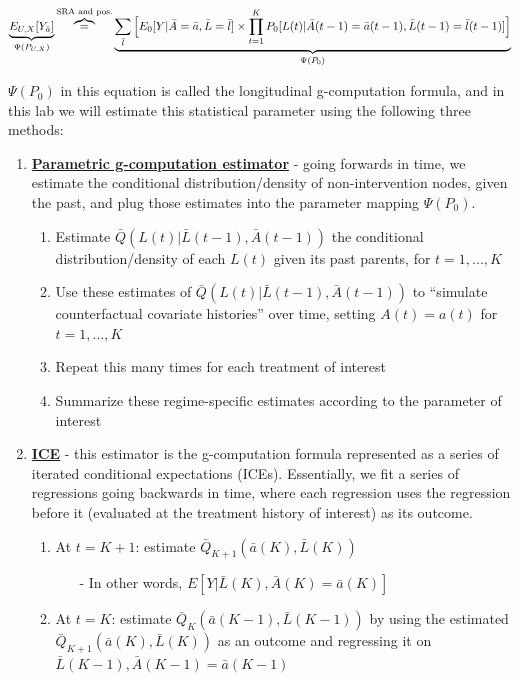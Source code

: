 \documentclass[answers]{exam}
\begin{document}
\[
\underbrace{E_{U,X}[Y_{\bar{a}}]}_{\Psi(P_{U,X})} \overbrace{=}^{\text{SRA and pos.}} \underbrace{\sum_{\bar{l}}\Big{[}E_0[Y|\bar{A} = \bar{a}, \bar{L} = \bar{l}]\times \prod_{t=1}^KP_0[L(t) | \bar{A}(t-1) = \bar{a}(t-1), \bar{L}(t-1) = \bar{l}(t-1)] \Big{]}}_{\Psi(P_0)}
\]

\noindent $\Psi(P_0)$ in this equation is called the longitudinal g-computation formula, and in this lab we will estimate this statistical parameter using the following three methods:

\begin{enumerate}
\item \textbf{\underline{Parametric g-computation estimator}} - going forwards in time, we estimate the conditional distribution/density of non-intervention nodes, given the past, and plug those estimates into the parameter mapping $\Psi(P_0)$.
\begin{enumerate}
\item Estimate $\bar{Q}(L(t)|\bar{L}(t-1), \bar{A}(t-1))$ the conditional distribution/density of each $L(t)$ given its past parents, for $t = 1,...,K$
\item Use these estimates of $\bar{Q}(L(t)|\bar{L}(t-1), \bar{A}(t-1))$ to ``simulate counterfactual covariate histories'' over time, setting $A(t) = a(t)$ for $t = 1,...,K$
\item Repeat this many times for each treatment of interest
\item Summarize these regime-specific estimates according to the parameter of interest
\end{enumerate}
\item \textbf{\underline{ICE}} - this estimator is the g-computation formula represented as a series of iterated conditional expectations (ICEs). Essentially, we fit a series of regressions going backwards in time, where each regression uses the regression before it (evaluated at the treatment history of interest) as its outcome. 
\begin{enumerate}
\item At $t = K+1$: estimate $\bar{Q}_{K+1}(\bar{a}(K), \bar{L}(K))$
\begin{itemize}
\item[-] In other words, $E[Y|\bar{L}(K), \bar{A}(K) = \bar{a}(K)]$
\end{itemize}
\item At $t = K$: estimate $\bar{Q}_{K}(\bar{a}(K-1), \bar{L}(K-1))$ by using the estimated $\bar{Q}_{K+1}(\bar{a}(K), \bar{L}(K))$ as an outcome and regressing it on $\bar{L}(K-1), \bar{A}(K-1) = \bar{a}(K-1)$

\end{enumerate}
\end{enumerate}
\end{document}
